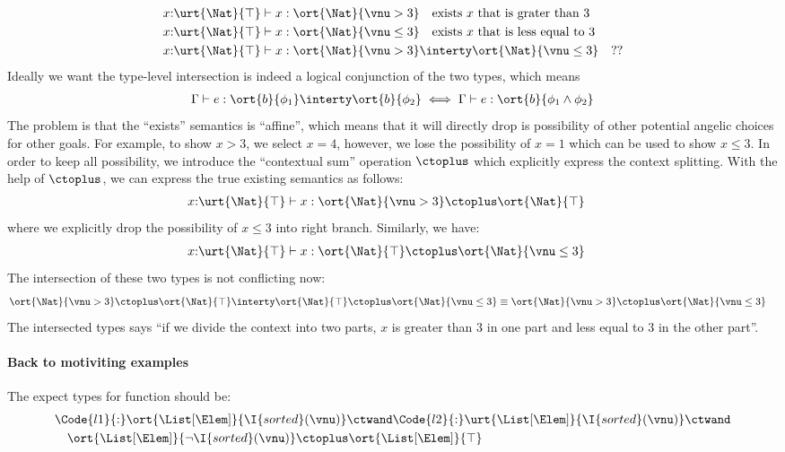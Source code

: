 \begin{align*}
  &x{:}\urt{\Nat}{\top} \vdash x : \ort{\Nat}{\vnu > 3} \quad \text{exists $x$ that is grater than $3$}
  \\&x{:}\urt{\Nat}{\top} \vdash x : \ort{\Nat}{\vnu \leq 3} \quad \text{exists $x$ that is less equal to $3$}
  \\&x{:}\urt{\Nat}{\top} \vdash x : \ort{\Nat}{\vnu > 3} \interty \ort{\Nat}{\vnu 
  \leq 3} \quad ??
\end{align*}\noindent
Ideally we want the type-level intersection is indeed a logical conjunction of the two types, which means
\begin{align*}
  \Gamma \vdash e : \ort{b}{\phi_1} \interty \ort{b}{\phi_2} \iff \Gamma \vdash e : \ort{b}{\phi_1 \land \phi_2}
\end{align*}\noindent
The problem is that the ``exists'' semantics is ``affine'', which means that it will directly drop is possibility of other potential angelic choices for other goals. For example, to show $x > 3$, we select $x = 4$, however, we lose the possibility of $x = 1$ which can be used to show $x \leq 3$. In order to keep all possibility, we introduce the ``contextual sum'' operation $\ctoplus$ which explicitly express the context splitting. With the help of $\ctoplus$, we can express the true existing semantics as follows:
\begin{align*}
  &x{:}\urt{\Nat}{\top} \vdash x : \ort{\Nat}{\vnu > 3} \ctoplus \ort{\Nat}{\top}
\end{align*}\noindent
where we explicitly drop the possibility of $x \leq 3$ into right branch. Similarly, we have:
\begin{align*}
  &x{:}\urt{\Nat}{\top} \vdash x : \ort{\Nat}{\top} \ctoplus \ort{\Nat}{\vnu \leq 3} 
\end{align*}\noindent
The intersection of these two types is not conflicting now:
\begin{align*}
  &\ort{\Nat}{\vnu > 3} \ctoplus \ort{\Nat}{\top} \interty \ort{\Nat}{\top} \ctoplus \ort{\Nat}{\vnu \leq 3}  \equiv \ort{\Nat}{\vnu > 3} \ctoplus \ort{\Nat}{\vnu \leq 3}
\end{align*}\noindent
The intersected types says ``if we divide the context into two parts, $x$ is greater than $3$ in one part and less equal to $3$ in the other part''.

\paragraph{Back to motiviting examples} The expect types for  function should be:
\begin{align*}
  &\Code{l1}{:}\ort{\List[\Elem]}{\I{sorted}(\vnu)} \ctwand \Code{l2}{:}\urt{\List[\Elem]}{\I{sorted}(\vnu)} \ctwand
  \\&\quad\ort{\List[\Elem]}{\neg \I{sorted}(\vnu)} \ctoplus \ort{\List[\Elem]}{\top}
\end{align*}

